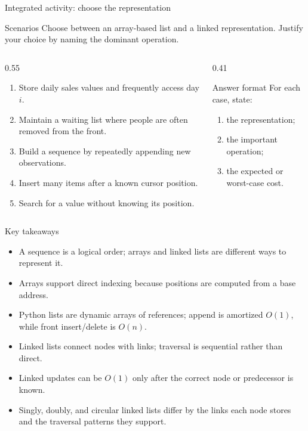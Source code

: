 \documentclass[aspectratio=169]{beamer}
\begin{document}
\begin{frame}{Integrated activity: choose the representation}
\small
\begin{block}{Scenarios}
Choose between an array-based list and a linked representation. Justify your choice by naming the dominant operation.
\end{block}
\begin{columns}[T,onlytextwidth]
\begin{column}{0.55\textwidth}
\begin{enumerate}
  \item Store daily sales values and frequently access day $i$.
  \item Maintain a waiting list where people are often removed from the front.
  \item Build a sequence by repeatedly appending new observations.
  \item Insert many items after a known cursor position.
  \item Search for a value without knowing its position.
\end{enumerate}
\end{column}
\begin{column}{0.41\textwidth}
\begin{alertblock}{Answer format}
For each case, state:
\begin{enumerate}
  \item the representation;
  \item the important operation;
  \item the expected or worst-case cost.
\end{enumerate}
\end{alertblock}
\end{column}
\end{columns}
\end{frame}

\begin{frame}{Key takeaways}
\small
\begin{itemize}
  \item A sequence is a logical order; arrays and linked lists are different ways to represent it.
  \item Arrays support direct indexing because positions are computed from a base address.
  \item Python lists are dynamic arrays of references; append is amortized $O(1)$, while front insert/delete is $O(n)$.
  \item Linked lists connect nodes with links; traversal is sequential rather than direct.
  \item Linked updates can be $O(1)$ only after the correct node or predecessor is known.
  \item Singly, doubly, and circular linked lists differ by the links each node stores and the traversal patterns they support.
\end{itemize}
\end{frame}
\end{document}
